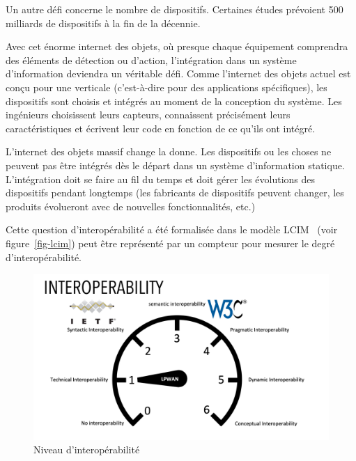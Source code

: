 Un autre défi concerne le nombre de dispositifs. Certaines études prévoient 500 milliards de dispositifs à la fin de la décennie.

  \vspace{1em}
 \begin{figure}
\end{figure}
Avec cet énorme internet des objets, où presque chaque équipement comprendra des éléments de détection ou d’action, l’intégration dans un système d’information deviendra un véritable défi. Comme l’internet des objets actuel est conçu pour une verticale (c'est-à-dire pour des applications spécifiques), les dispositifs sont choisis et intégrés au moment de la conception du système. Les ingénieurs choisissent leurs capteurs, connaissent précisément leurs caractéristiques et écrivent leur code en fonction de ce qu'ils ont intégré. 

L’internet des objets massif change la donne. Les dispositifs ou les choses ne peuvent pas être intégrés dès le départ dans un système d’information statique. L’intégration doit se faire au fil du temps et doit gérer les évolutions des dispositifs pendant longtemps (les fabricants de dispositifs peuvent changer, les produits évolueront avec de nouvelles fonctionnalités, etc.)

Cette question d’interopérabilité a été formalisée dans le modèle \ac{LCIM}~\cite{tolk2003levels} (voir figure~\vref{fig-lcim}) peut être représenté par un compteur pour mesurer le degré d'interopérabilité.

\begin{figure}[tbp]
\centerline{\includegraphics[width=1\columnwidth]{Pictures/TPT2020.png}}
\caption{Niveau d'interopérabilité}
\label{fig-lcim}
\end{figure}


